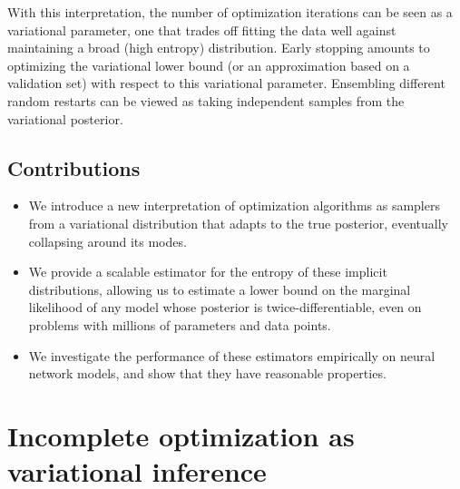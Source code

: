 \documentclass{article} %
\begin{document}
With this interpretation, the number of optimization iterations can be seen as a variational parameter, one that trades off fitting the data well against maintaining a broad (high entropy) distribution.
Early stopping amounts to optimizing the variational lower bound (or an approximation based on a validation set) with respect to this variational parameter.
Ensembling different random restarts can be viewed as taking independent samples from the variational posterior.


\subsection{Contributions}
\begin{itemize}
\item We introduce a new interpretation of optimization algorithms as samplers from a variational distribution that adapts to the true posterior, eventually collapsing around its modes.
\item We provide a scalable estimator for the entropy of these implicit distributions, allowing us to estimate a lower bound on the marginal likelihood of any model whose posterior is twice-differentiable, even on problems with millions of parameters and data points.
\item We investigate the performance of these estimators empirically on neural network models, and show that they have reasonable properties.
\end{itemize}

\section{Incomplete optimization as variational inference}
\label{sec:techintro}
\end{document}
